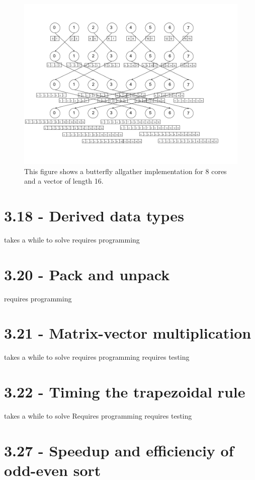 \documentclass[a4paper,11pt,twoside]{article}
\begin{document}
\begin{figure}
  \centering
    \includegraphics[width=1\textwidth]{allgather.png}
    \caption{This figure shows a butterfly allgather implementation for 8 cores and a vector of length 16.}
    \label{fig:allgather}
\end{figure}



\section{3.18 - Derived data types}
takes a while to solve
requires programming

\section{3.20 - Pack and unpack}
requires programming


\section{3.21 - Matrix-vector multiplication}
takes a while to solve
requires programming
requires testing

\section{3.22 - Timing the trapezoidal rule}
takes a while to solve
Requires programming
requires testing

\section{3.27 - Speedup and efficienciy of odd-even sort}



\end{document}
